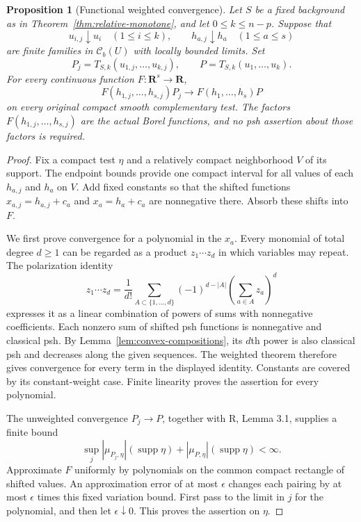 \documentclass[11pt,a4paper]{article}
\numberwithin{equation}{section}
\newtheorem{proposition}[theorem]{Proposition}
\theoremstyle{definition}
\theoremstyle{remark}
\newcommand{\Cb}{\mathcal C_b}
\begin{document}
\begin{proposition}[Functional weighted convergence]
\label{prop:functional-weights}
Let $S$ be a fixed background as in
Theorem~\ref{thm:relative-monotone}, and let $0\leq k\leq n-p$.
Suppose that
\[
 u_{i,j}\downarrow u_i\quad(1\leq i\leq k),
 \qquad h_{a,j}\downarrow h_a\quad(1\leq a\leq s)
\]
are finite families in $\Cb(U)$ with locally bounded limits. Set
\[
 P_j=T_{S,k}(u_{1,j},\ldots,u_{k,j}),\qquad
 P=T_{S,k}(u_1,\ldots,u_k).
\]
For every continuous function $F:\mathbf R^s\to\mathbf R$,
\[
 F(h_{1,j},\ldots,h_{s,j})P_j
 \longrightarrow F(h_1,\ldots,h_s)P
\]
on every original compact smooth complementary test. The factors
$F(h_{1,j},\ldots,h_{s,j})$ are the actual Borel functions, and no
psh assertion about those factors is required.
\end{proposition}

\begin{proof}
Fix a compact test $\eta$ and a relatively compact neighborhood $V$ of
its support. The endpoint bounds provide one compact interval for all
values of each $h_{a,j}$ and $h_a$ on $V$. Add fixed constants so that
the shifted functions $x_{a,j}=h_{a,j}+c_a$ and $x_a=h_a+c_a$ are
nonnegative there. Absorb these shifts into $F$.

We first prove convergence for a polynomial in the $x_a$. Every
monomial of total degree $d\geq1$ can be regarded as a product
$z_1\cdots z_d$ in which variables may repeat. The polarization
identity
\[
 z_1\cdots z_d
 =\frac1{d!}\sum_{A\subset\{1,\ldots,d\}}
       (-1)^{d-|A|}\left(\sum_{a\in A}z_a\right)^d
\]
expresses it as a linear combination of powers of sums with
nonnegative coefficients. Each nonzero sum of shifted psh functions
is nonnegative and classical psh. By
Lemma~\ref{lem:convex-compositions}, its $d$th power is also classical
psh and decreases along the given sequences. The weighted theorem
therefore gives convergence for every term in the displayed identity.
Constants are covered by its constant-weight case. Finite linearity
proves the assertion for every polynomial.

The unweighted convergence $P_j\to P$, together with \textup{R},
Lemma 3.1, supplies a finite bound
\[
 \sup_j|\mu_{P_j,\eta}|(\operatorname{supp}\eta)
       +|\mu_{P,\eta}|(\operatorname{supp}\eta)<\infty.
\]
Approximate $F$ uniformly by polynomials on the common compact
rectangle of shifted values. An approximation error of at most
$\epsilon$ changes each pairing by at most $\epsilon$ times this
fixed variation bound. First pass to the limit in $j$ for the
polynomial, and then let $\epsilon\downarrow0$. This proves the
assertion on $\eta$.
\end{proof}
\end{document}
